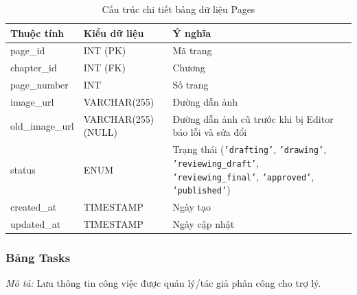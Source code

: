 \noindent
\begin{table}[H]
\centering
\renewcommand{\arraystretch}{1.3}
\begin{tabularx}{\textwidth}{|p{4cm}|p{3cm}|>{\raggedright\arraybackslash}X|}
\hline
\rowcolor{tableheader}
\textbf{Thuộc tính} & \textbf{Kiểu dữ liệu} & \textbf{Ý nghĩa} \\ \hline
page\_id & INT (PK) & Mã trang \\ \hline
chapter\_id & INT (FK) & Chương \\ \hline
page\_number & INT & Số trang \\ \hline
image\_url & VARCHAR(255) & Đường dẫn ảnh \\ \hline
old\_image\_url & VARCHAR(255) (NULL) & Đường dẫn ảnh cũ trước khi bị Editor báo lỗi và sửa đổi \\ \hline
status & ENUM & Trạng thái (\texttt{'drafting'}, \texttt{'drawing'}, \texttt{'reviewing\_draft'}, \texttt{'reviewing\_final'}, \texttt{'approved'}, \texttt{'published'}) \\ \hline
created\_at & TIMESTAMP & Ngày tạo \\ \hline
updated\_at & TIMESTAMP & Ngày cập nhật \\ \hline
\end{tabularx}
\caption{Cấu trúc chi tiết bảng dữ liệu Pages}
\label{tab:db_pages}
\end{table}
\vspace{0.5cm}

\subsubsection{Bảng Tasks}
\label{subsubsec:tbl_tasks}
\textit{Mô tả:} Lưu thông tin công việc được quản lý/tác giả phân công cho trợ lý.

